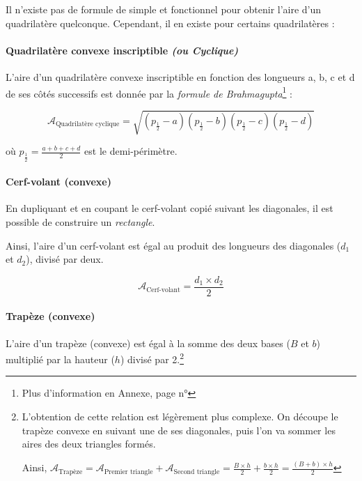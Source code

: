 \documentclass[a4paper, twoside]{article}
\begin{document}
Il n'existe pas de formule de simple et fonctionnel pour obtenir l'aire
d'un quadrilatère quelconque. Cependant, il en existe pour certains quadrilatères :

\vspace*{-0.25cm}

\paragraph*{Quadrilatère convexe inscriptible \textit{(ou Cyclique)}}

L'aire d'un quadrilatère convexe inscriptible en fonction des longueurs a, b, c et d de ses
côtés successifs est donnée par la \emph{formule de Brahmagupta}\footnote{Plus d'information en Annexe, page n°\pageref*{formule_de_Brahmagupta}} :

$$ \mathcal{A}_{\text{Quadrilatère cyclique}} = \sqrt{(p_{\frac{1}{2}}-a)(p_{\frac{1}{2}}-b)(p_{\frac{1}{2}}-c)(p_{\frac{1}{2}}-d)} $$

où $p_{\frac{1}{2}} = \frac{a + b + c + d}{2}$ est le demi-périmètre.

\vspace*{-0.25cm}

\paragraph*{Cerf-volant (convexe)}

En dupliquant et en coupant le cerf-volant copié suivant les diagonales,
il est possible de construire un \textit{rectangle}.

Ainsi, l'aire d'un cerf-volant est égal au produit des longueurs
des diagonales ($d_{1}$ et $d_{2}$), divisé par deux.

$$\mathcal{A}_{\text{Cerf-volant}} = \frac{ d_{1} \times d_{2} }{ 2 }$$

\vspace*{-0.25cm}

\paragraph*{Trapèze (convexe)}

L'aire d'un trapèze (convexe) est égal à la somme des
deux bases ($B$ et $b$) multiplié par la hauteur ($h$) divisé par 2.\footnote{
	L'obtention de cette relation est légèrement plus complexe.
	On découpe le trapèze convexe en suivant une de ses diagonales,
	puis l'on va sommer les aires des deux triangles formés.

	Ainsi, $\mathcal{A}_{\text{Trapèze}} = \mathcal{A}_{\text{Premier triangle}} + \mathcal{A}_{\text{Second triangle}} = \frac{B \times h}{2} + \frac{b \times h}{2} = \frac {(B+b) \times h}{2}$
}
\end{document}

